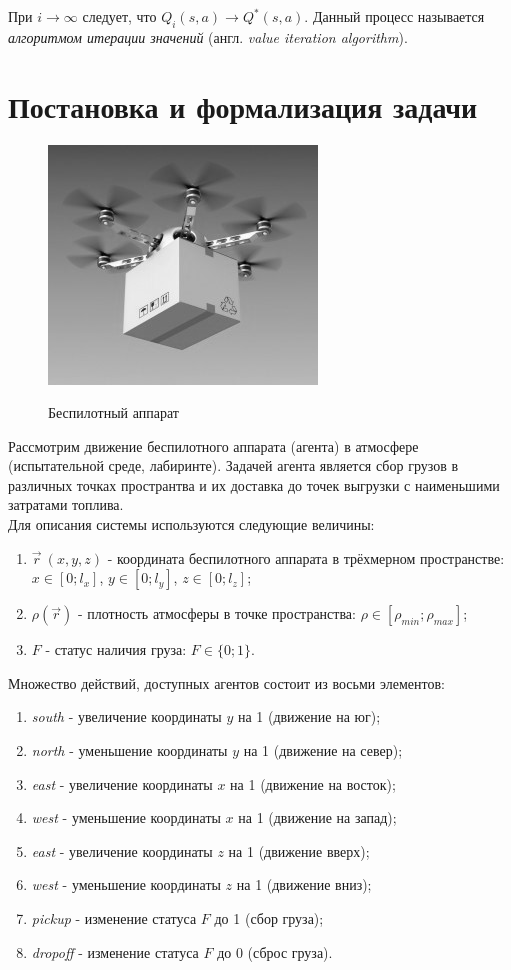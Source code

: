 \documentclass[12pt, a4paper]{report}
\theoremstyle{definition}
\theoremstyle{plain}
\theoremstyle{remark}
\theoremstyle{remark}
\theoremstyle{definition}
\begin{document}
При $i \rightarrow \infty$ следует, что $Q_{i}(s, a) \rightarrow Q^*(s, a)$. Данный процесс называется \textit{алгоритмом итерации значений} (англ. \textit{value iteration algorithm}).

\section{Постановка и формализация задачи}

\begin{figure}[h]
	{\includegraphics[scale = 0.6]{dronebw.jpg}}
	\caption{Беспилотный аппарат}
\end{figure}

Рассмотрим движение беспилотного аппарата (агента) в атмосфере (испытательной среде, лабиринте). Задачей агента является сбор грузов в различных точках пространтва и их доставка до точек выгрузки с наименьшими затратами топлива.\\

Для описания системы используются следующие величины:
\begin{enumerate}
	\item $\vec{r}\ (x,y,z)$ - координата беспилотного аппарата в трёхмерном пространстве: $x\in[0; l_{x}]$, $y\in[0; l_{y}]$, $z\in[0; l_{z}]$;
	\item $\rho (\vec{r})$ - плотность атмосферы в точке пространства:  $\rho \in[\rho_{min}; \rho_{max}]$;
	\item $F$ - статус наличия груза: $F \in \lbrace 0; 1\rbrace$.
\end{enumerate}

Множество действий, доступных агентов состоит из восьми элементов:
\begin{enumerate}
	\item \textit{south} - увеличение координаты $y$ на 1 (движение на юг);
	\item \textit{north} - уменьшение координаты $y$ на 1 (движение на север);
	\item \textit{east} - увеличение координаты $x$ на 1 (движение на восток);
	\item \textit{west} - уменьшение координаты $x$ на 1 (движение на запад);
	\item \textit{east} - увеличение координаты $z$ на 1 (движение вверх);
	\item \textit{west} - уменьшение координаты $z$ на 1 (движение вниз);
	\item \textit{pickup} - изменение статуса $F$ до 1 (сбор груза);
	\item \textit{dropoff} - изменение статуса $F$ до 0 (сброс груза).	
\end{enumerate}
\end{document}
